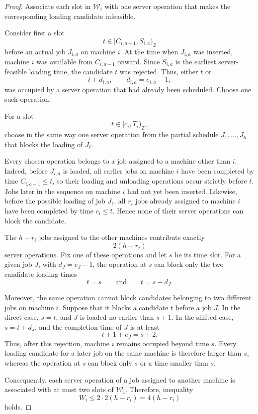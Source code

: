 \documentclass[11pt]{article}
\begin{document}
\begin{proof}
Associate each slot in \(\mathcal W_i\) with one server operation that makes the
corresponding loading candidate infeasible.

Consider first a slot
\[
        t\in[C_{i,a-1},S_{i,a})_{\mathbb Z}
\]
before an actual job \(J_{i,a}\) on machine \(i\). At the time when
\(J_{i,a}\) was inserted, machine \(i\) was available from
\(C_{i,a-1}\) onward. Since \(S_{i,a}\) is the earliest server-feasible loading
time, the candidate \(t\) was rejected. Thus, either \(t\) or
\[
        t+d_{i,a},
        \qquad d_{i,a}=e_{i,a}-1,
\]
was occupied by a server operation that had already been scheduled. Choose one
such operation.

For a slot
\[
        t\in[c_i,T_i)_{\mathbb Z},
\]
choose in the same way one server operation from the partial schedule
\(J_1,\ldots,J_h\) that blocks the loading of \(J_\ell\).

Every chosen operation belongs to a job assigned to a machine other than
\(i\). Indeed, before \(J_{i,a}\) is loaded, all earlier jobs on machine \(i\)
have been completed by time \(C_{i,a-1}\le t\), so their loading and unloading
operations occur strictly before \(t\). Jobs later in the sequence on machine
\(i\) had not yet been inserted. Likewise, before the possible loading of job 
\(J_\ell\), all \(r_i\) jobs already assigned to machine \(i\) have been completed
by time \(c_i\le t\). Hence none of their server operations can block the
candidate.

The \(h-r_i\) jobs assigned to the other machines contribute exactly
\[
        2(h-r_i)
\]
server operations. Fix one of these operations and let \(s\) be its time slot.
For a given job \(J\), with \(d_J=e_J-1\), the operation at \(s\) can block
only the two candidate loading times
\[
        t=s
        \qquad\text{and}\qquad
        t=s-d_J.
\]

Moreover, the same operation cannot block candidates belonging to two different
jobs on machine \(i\). Suppose that it blocks a candidate \(t\) before a job
\(J\). In the direct case, \(s=t\), and \(J\) is loaded no earlier than
\(s+1\). In the shifted case, \(s=t+d_J\), and the completion time of \(J\) is
at least
\[
        t+1+e_J=s+2.
\]
Thus, after this rejection, machine \(i\) remains occupied beyond time \(s\).
Every loading candidate for a later job on the same machine is therefore larger
than \(s\), whereas the operation at \(s\) can block only \(s\) or a time
smaller than \(s\).

Consequently, each server operation of a job assigned to another machine is
associated with at most two slots of \(\mathcal W_i\). Therefore, inequality
\[
        W_i\le 2\cdot 2(h-r_i)=4(h-r_i)
\]
holds.
\end{proof}
\end{document}

